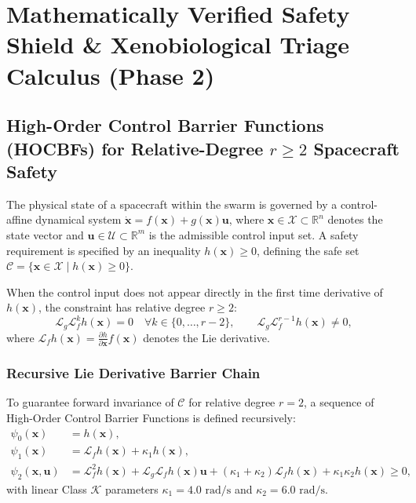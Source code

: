\documentclass[11pt,onecolumn]{article}
\begin{document}
\section{Mathematically Verified Safety Shield \& Xenobiological Triage Calculus (Phase 2)}

\subsection{High-Order Control Barrier Functions (HOCBFs) for Relative-Degree \texorpdfstring{$r \ge 2$}{r >= 2} Spacecraft Safety}
\label{subsec:hocbf_safety}
The physical state of a spacecraft within the swarm is governed by a control-affine dynamical system $\dot{\mathbf{x}} = f(\mathbf{x}) + g(\mathbf{x})\mathbf{u}$, where $\mathbf{x} \in \mathcal{X} \subset \mathbb{R}^n$ denotes the state vector and $\mathbf{u} \in \mathcal{U} \subset \mathbb{R}^m$ is the admissible control input set. A safety requirement is specified by an inequality $h(\mathbf{x}) \ge 0$, defining the safe set $\mathcal{C} = \{ \mathbf{x} \in \mathcal{X} \mid h(\mathbf{x}) \ge 0 \}$.

When the control input does not appear directly in the first time derivative of $h(\mathbf{x})$, the constraint has relative degree $r \ge 2$:
\begin{equation}
    \mathcal{L}_g \mathcal{L}_f^{k} h(\mathbf{x}) = 0 \quad \forall k \in \{0, \dots, r-2\}, \qquad \mathcal{L}_g \mathcal{L}_f^{r-1} h(\mathbf{x}) \neq 0,
\end{equation}
where $\mathcal{L}_f h(\mathbf{x}) = \frac{\partial h}{\partial \mathbf{x}} f(\mathbf{x})$ denotes the Lie derivative.

\subsubsection{Recursive Lie Derivative Barrier Chain}
To guarantee forward invariance of $\mathcal{C}$ for relative degree $r = 2$, a sequence of High-Order Control Barrier Functions is defined recursively:
\begin{align}
    \psi_0(\mathbf{x}) &= h(\mathbf{x}), \label{eq:psi_0_chain} \\
    \psi_1(\mathbf{x}) &= \mathcal{L}_f h(\mathbf{x}) + \kappa_1 h(\mathbf{x}), \label{eq:psi_1_chain} \\
    \psi_2(\mathbf{x}, \mathbf{u}) &= \mathcal{L}_f^2 h(\mathbf{x}) + \mathcal{L}_g \mathcal{L}_f h(\mathbf{x})\mathbf{u} + (\kappa_1 + \kappa_2)\mathcal{L}_f h(\mathbf{x}) + \kappa_1 \kappa_2 h(\mathbf{x}) \ge 0, \label{eq:psi_2_chain}
\end{align}
with linear Class $\mathcal{K}$ parameters $\kappa_1 = 4.0\text{ rad/s}$ and $\kappa_2 = 6.0\text{ rad/s}$.
\end{document}
